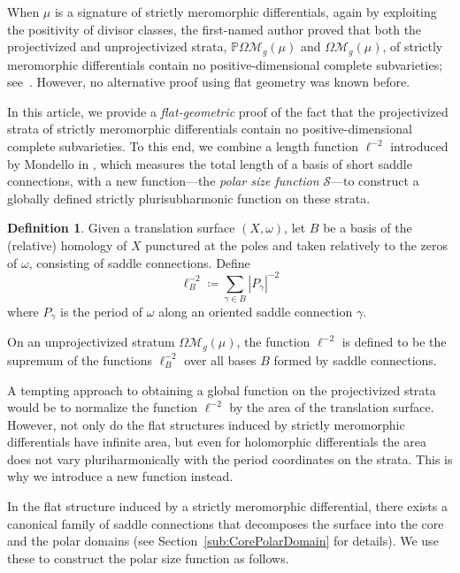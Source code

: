 \documentclass[11]{amsart}
\theoremstyle{plain}
\theoremstyle{definition}
\newtheorem{definition}[theorem]{Definition}
\begin{document}
When $\mu$ is a signature of strictly meromorphic differentials, again by exploiting the positivity of divisor classes, the first-named author proved that both the projectivized and unprojectivized strata, $\mathbb P\Omega\mathcal M_{g}(\mu)$ and $\Omega\mathcal M_{g}(\mu)$, of strictly meromorphic differentials contain no positive-dimensional complete subvarieties; see~\cite{C19, C24}. However, no alternative proof using flat geometry was known before. 

In this article, we provide a {\em flat-geometric} proof of the fact that the projectivized strata of strictly meromorphic differentials contain no positive-dimensional complete subvarieties. To this end, we combine a length function $\ell^{-2}$ introduced by Mondello in \cite{Mondello}, which measures the total length of a basis of short saddle connections, with a new function---the \textit{polar size function} $\mathcal{S}$---to construct a globally defined strictly plurisubharmonic function on these strata. 

\begin{definition}\label{defn:Mondello}
Given a translation surface $(X,\omega)$, let $B$ be a basis of the (relative) homology of $X$ punctured at the poles and taken relatively to the zeros of $\omega$, consisting of saddle connections. Define $$\ell^{-2}_{B}\coloneqq\sum\limits_{\gamma \in B} \left| P_{\gamma} \right|^{-2}$$
where $P_{\gamma}$ is the period of $\omega$ along an oriented saddle connection $\gamma$.
\par
On an unprojectivized stratum $\Omega\mathcal M_{g}(\mu)$, the function $\ell^{-2}$ is defined to be the supremum of the functions $\ell^{-2}_{B}$ over all bases $B$ formed by saddle connections.
\end{definition}

A tempting approach to obtaining a global function on the projectivized strata would be to normalize the function $\ell^{-2}$ by the area of the translation surface. However, not only do the flat structures induced by strictly meromorphic differentials have infinite area, but even for holomorphic differentials the area does not vary pluriharmonically with the period coordinates on the strata. This is why we introduce a new function instead. 
\par
In the flat structure induced by a strictly meromorphic differential, there exists a canonical family of saddle connections that decomposes the surface into the core and the polar domains (see Section~\ref{sub:CorePolarDomain} for details). We use these to construct the polar size function as follows. 
\end{document}
